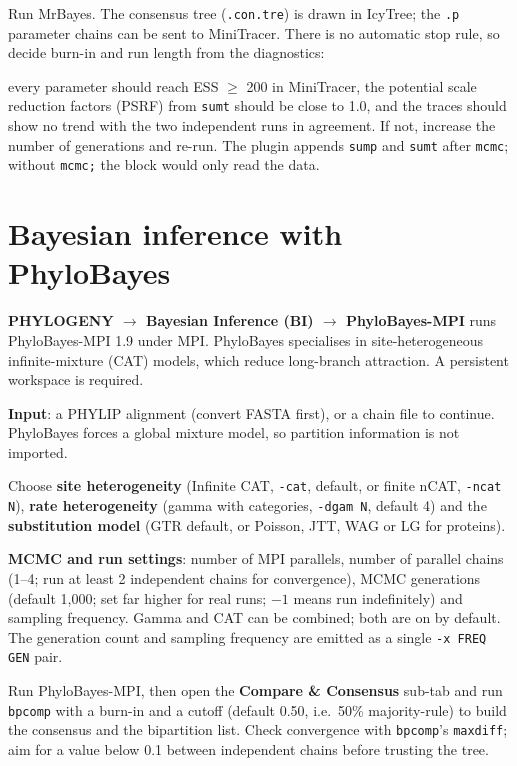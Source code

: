 \documentclass[10pt]{report}
\begin{document}
Run MrBayes. The consensus tree (\texttt{.con.tre}) is drawn in IcyTree; the
\texttt{.p} parameter chains can be sent to MiniTracer. There is no automatic
stop rule, so decide burn-in and run length from the diagnostics:

every parameter should reach ESS $\geq$ 200 in MiniTracer, the potential scale
reduction factors (PSRF) from \texttt{sumt} should be close to 1.0, and the
traces should show no trend with the two independent runs in agreement. If not,
increase the number of generations and re-run. The plugin appends \texttt{sump} and \texttt{sumt} after \texttt{mcmc};
without \texttt{mcmc;} the block would only read the data.

\section{Bayesian inference with PhyloBayes}

\textbf{PHYLOGENY $\rightarrow$ Bayesian Inference (BI) $\rightarrow$
PhyloBayes-MPI} runs PhyloBayes-MPI 1.9 \cite{phylobayes} under MPI. PhyloBayes specialises in
site-heterogeneous infinite-mixture (CAT) models, which reduce long-branch
attraction. A persistent workspace is required.

\textbf{Input}: a PHYLIP alignment (convert FASTA first), or a chain file to
continue. PhyloBayes forces a global mixture model, so partition information is
not imported.

Choose \textbf{site heterogeneity} (Infinite CAT, \texttt{-cat}, default, or
finite nCAT, \texttt{-ncat N}), \textbf{rate heterogeneity} (gamma with
categories, \texttt{-dgam N}, default 4) and the \textbf{substitution model}
(GTR default, or Poisson, JTT, WAG or LG for proteins).

\textbf{MCMC and run settings}: number of MPI parallels, number of parallel
chains (1--4; run at least 2 independent chains for convergence), MCMC
generations (default 1{,}000; set far higher for real runs; $-1$ means run
indefinitely) and sampling frequency. Gamma and CAT can be combined; both are
on by default. The generation count and sampling frequency are emitted as a
single \texttt{-x FREQ GEN} pair.

Run PhyloBayes-MPI, then open the \textbf{Compare \& Consensus} sub-tab and run
\texttt{bpcomp} with a burn-in and a cutoff (default 0.50, i.e.\ 50\%
majority-rule) to build the consensus and the bipartition list. Check
convergence with \texttt{bpcomp}'s \texttt{maxdiff}; aim for a value below 0.1
between independent chains before trusting the tree.
\end{document}
